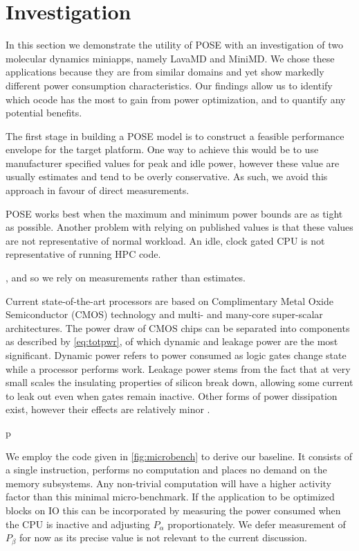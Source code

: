 \section{Investigation}
\label{sec:investigation}
In this section we demonstrate the utility of POSE with an investigation of two molecular dynamics miniapps, namely LavaMD and MiniMD.
We chose these applications because they are from similar domains and yet show markedly different power consumption characteristics.
Our findings allow us to identify which ocode has the most to gain from power optimization, and to quantify any potential benefits.


The first stage in building a POSE model is to construct a feasible performance envelope for the target platform.
One way to achieve this would be to use manufacturer specified values for peak and idle power, however these value are usually estimates and tend to be overly conservative.
As such, we avoid this approach in favour of direct measurements.

POSE works best when the maximum and minimum power bounds are as tight as possible.
Another problem with relying on published values is that these values are not representative of normal workload.
An idle, clock gated CPU is not representative of running HPC code.

, and so we rely on measurements rather than estimates.



Current state-of-the-art processors are based on Complimentary Metal Oxide Semiconductor (CMOS) technology and multi- and many-core super-scalar architectures.
The power draw of CMOS chips can be separated into components as described by \autoref{eq:totpwr}, of which dynamic and leakage power are the most significant.
Dynamic power refers to power consumed as logic gates change state while a processor performs work. 
Leakage power stems from the fact that at very small scales the insulating properties of silicon break down, allowing some current to leak out even when gates remain inactive.
Other forms of power dissipation exist, however their effects are relatively minor \cite{kaxiras:2008aa}.

p

We employ the code given in \autoref{fig:microbench} to derive our baseline.  It consists of a single instruction, performs no computation and places no demand on the memory subsystems. Any non-trivial computation will have a higher activity factor than this minimal micro-benchmark. If the application to be optimized blocks on IO this can be incorporated by measuring the power consumed when the CPU is inactive and adjusting $P_\alpha$ proportionately. We defer measurement of $P_{\beta}$ for now as its precise value is not relevant to the current discussion. 

